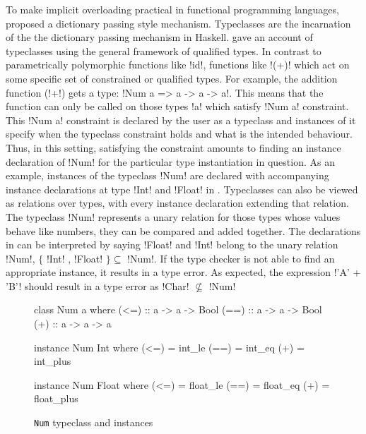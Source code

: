 \documentclass[manuscript,screen,nonacm]{acmart}
\begin{document}
To make implicit overloading practical in functional programming languages, \citet{wadler_polymorphism_1989} proposed a dictionary passing style mechanism. Typeclasses are the incarnation of the the dictionary passing mechanism in Haskell. \citet{jones_qualified_1994} gave an account of typeclasses using the general framework of qualified types. In contrast to parametrically polymorphic functions like !id!, functions like !(+)! which act on some specific set of constrained or qualified types. For example, the addition function (!+!) gets a type: !Num a => a -> a -> a!. This means that the function can only be called on those types !a! which satisfy !Num a! constraint. This !Num a! constraint is declared by the user as a typeclass and instances of it specify when the typeclass constraint holds and what is the intended behaviour. Thus, in this setting, satisfying the constraint amounts to finding an instance declaration of !Num! for the particular type instantiation in question. As an example, instances of the typeclass !Num! are declared with accompanying instance declarations at type !Int! and !Float! in . Typeclasses can also be viewed as relations over types, with every instance declaration extending that relation. The typeclass !Num! represents a unary relation for those types whose values behave like numbers, they can be compared and added together. The declarations in  can be interpreted by saying !Float! and !Int! belong to the unary relation !Num!, $\{$ !Int! , !Float! $\} \subseteq $ !Num!. If the type checker is not able to find an appropriate instance, it results in a type error. As expected, the expression !'A' + 'B'! should result in a type error as !Char! $\not\subseteq$ !Num!


\begin{figure}[ht]
\centering
\begin{minipage}[ht]{0.3\linewidth}
\begin{code}
class Num a where
  (<=) :: a -> a -> Bool
  (==) :: a -> a -> Bool
  (+) :: a -> a -> a
\end{code}
\end{minipage}%
\begin{minipage}[ht]{0.3\linewidth}
\begin{code}
instance Num Int where
  (<=) = int_le
  (==) = int_eq
  (+) = int_plus
\end{code}
\end{minipage}%
\begin{minipage}[ht]{0.3\linewidth}
\begin{code}
instance Num Float where
  (<=) = float_le
  (==) = float_eq
  (+) = float_plus
\end{code}
\end{minipage}
\caption{\lstinline{Num} typeclass and instances}
\label{fig:tc-num}
\end{figure}
\end{document}
